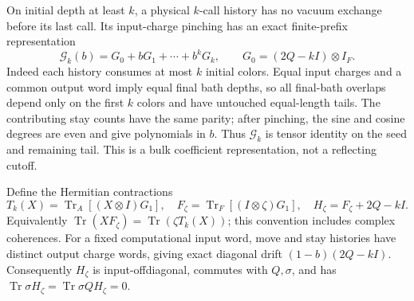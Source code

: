 \documentclass[11pt]{article}
\newcommand{\Tr}{\operatorname{Tr}}
\begin{document}
On initial depth at least $k$, a physical $k$-call history has no vacuum
exchange before its last call. Its input-charge pinching has an exact
finite-prefix representation
\begin{equation}\label{eq:bulkpoly}
 \mathcal G_k(b)=G_0+bG_1+\cdots+b^kG_k,
 \qquad G_0=(2Q-kI)\otimes I_F.
\end{equation}
Indeed each history consumes at most $k$ initial colors. Equal input
charges and a common output word imply equal final bath depths, so all
final-bath overlaps depend only on the first $k$ colors and have untouched
equal-length tails. The contributing stay counts have the same parity;
after pinching, the sine and cosine degrees are even and give polynomials
in $b$. Thus $\mathcal G_k$ is tensor identity on the seed and remaining
tail. This is a bulk coefficient representation, not a reflecting cutoff.

Define the Hermitian contractions
\[
 T_k(X)=\Tr_A[(X\otimes I)G_1],\quad
 F_\zeta=\Tr_F[(I\otimes\zeta)G_1],\quad
 H_\zeta=F_\zeta+2Q-kI.
\]
Equivalently $\Tr(XF_\zeta)=\Tr(\zeta T_k(X))$; this convention
includes complex coherences. For a fixed computational input word, move
and stay histories have distinct output charge words, giving exact
diagonal drift $(1-b)(2Q-kI)$. Consequently $H_\zeta$ is input-offdiagonal,
commutes with $Q,\sigma$, and has
$\Tr\sigma H_\zeta=\Tr\sigma QH_\zeta=0$.
\end{document}
